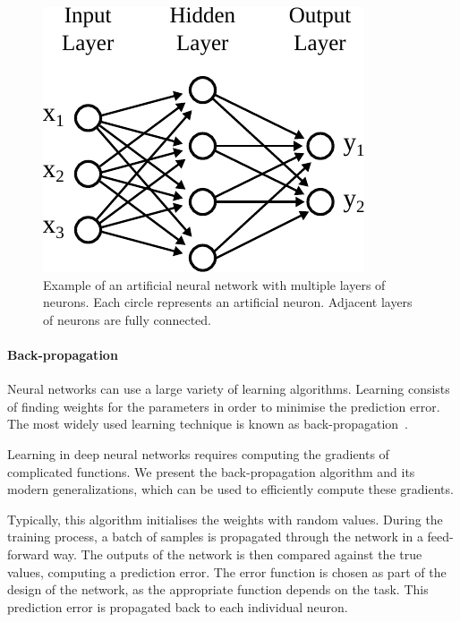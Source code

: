 \begin{figure}[h]
  \centering
  \includegraphics[scale=0.85]{src/background/figs/ML-feed-forward-network.pdf}
  \caption{Example of an artificial neural network with multiple layers of neurons. Each circle represents an artificial neuron. Adjacent layers of neurons are fully connected.}
  \label{fig:ML-feed-forward-network}
\end{figure}



\paragraph{Back-propagation}

Neural networks can use a large variety of learning algorithms.
Learning consists of finding weights for the parameters in order to minimise the prediction error.
The most widely used learning technique is known as back-propagation~\cite{rumelhart88,goodfellow16}.

Learning in deep neural networks requires computing the gradients of complicated functions.
We present the back-propagation algorithm and its modern generalizations, which can be used to eﬃciently compute these gradients.

Typically, this algorithm initialises the weights with random values.
During the training process, a batch of samples is propagated through the network in a feed-forward way.
The outputs of the network is then compared against the true values, computing a prediction error.
The error function is chosen as part of the design of the network, as the appropriate function depends on the task.
This prediction error is propagated back to each individual neuron. %

